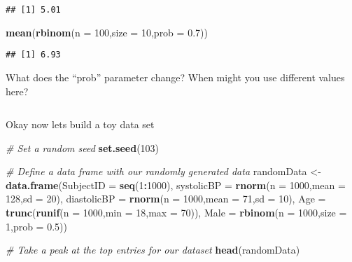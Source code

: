 \documentclass[
]{article}
\newenvironment{Shaded}{\begin{snugshade}}{\end{snugshade}}
\newcommand{\AttributeTok}[1]{\textcolor[rgb]{0.13,0.29,0.53}{#1}}
\newcommand{\CommentTok}[1]{\textcolor[rgb]{0.56,0.35,0.01}{\textit{#1}}}
\newcommand{\DecValTok}[1]{\textcolor[rgb]{0.00,0.00,0.81}{#1}}
\newcommand{\FloatTok}[1]{\textcolor[rgb]{0.00,0.00,0.81}{#1}}
\newcommand{\FunctionTok}[1]{\textcolor[rgb]{0.13,0.29,0.53}{\textbf{#1}}}
\newcommand{\NormalTok}[1]{#1}
\newcommand{\OtherTok}[1]{\textcolor[rgb]{0.56,0.35,0.01}{#1}}
\newcommand{\SpecialCharTok}[1]{\textcolor[rgb]{0.81,0.36,0.00}{\textbf{#1}}}
\newcommand{\StringTok}[1]{\textcolor[rgb]{0.31,0.60,0.02}{#1}}
\begin{document}
\begin{verbatim}
## [1] 5.01
\end{verbatim}

\begin{Shaded}
\begin{Highlighting}[]
\FunctionTok{mean}\NormalTok{(}\FunctionTok{rbinom}\NormalTok{(}\AttributeTok{n =} \DecValTok{100}\NormalTok{,}\AttributeTok{size =} \DecValTok{10}\NormalTok{,}\AttributeTok{prob =} \FloatTok{0.7}\NormalTok{))}
\end{Highlighting}
\end{Shaded}

\begin{verbatim}
## [1] 6.93
\end{verbatim}

What does the ``prob'' parameter change? When might you use different
values here?

\(~\)

Okay now lets build a toy data set

\begin{Shaded}
\begin{Highlighting}[]
\CommentTok{\# Set a random seed}
\FunctionTok{set.seed}\NormalTok{(}\DecValTok{103}\NormalTok{) }

\CommentTok{\# Define a data frame with our randomly generated data}
\NormalTok{randomData }\OtherTok{\textless{}{-}} \FunctionTok{data.frame}\NormalTok{(}\StringTok{\textquotesingle{}SubjectID\textquotesingle{}} \OtherTok{=} \FunctionTok{seq}\NormalTok{(}\DecValTok{1}\SpecialCharTok{:}\DecValTok{1000}\NormalTok{), }
                         \StringTok{\textquotesingle{}systolicBP\textquotesingle{}} \OtherTok{=} \FunctionTok{rnorm}\NormalTok{(}\AttributeTok{n =} \DecValTok{1000}\NormalTok{,}\AttributeTok{mean =} \DecValTok{128}\NormalTok{,}\AttributeTok{sd =} \DecValTok{20}\NormalTok{),}
                         \StringTok{\textquotesingle{}diastolicBP\textquotesingle{}} \OtherTok{=} \FunctionTok{rnorm}\NormalTok{(}\AttributeTok{n =} \DecValTok{1000}\NormalTok{,}\AttributeTok{mean =} \DecValTok{71}\NormalTok{,}\AttributeTok{sd =} \DecValTok{10}\NormalTok{),}
                         \StringTok{\textquotesingle{}Age\textquotesingle{}} \OtherTok{=} \FunctionTok{trunc}\NormalTok{(}\FunctionTok{runif}\NormalTok{(}\AttributeTok{n =} \DecValTok{1000}\NormalTok{,}\AttributeTok{min =} \DecValTok{18}\NormalTok{,}\AttributeTok{max =} \DecValTok{70}\NormalTok{)),}
                         \StringTok{\textquotesingle{}Male\textquotesingle{}} \OtherTok{=} \FunctionTok{rbinom}\NormalTok{(}\AttributeTok{n =} \DecValTok{1000}\NormalTok{,}\AttributeTok{size =} \DecValTok{1}\NormalTok{,}\AttributeTok{prob =} \FloatTok{0.5}\NormalTok{))}

\CommentTok{\# Take a peak at the top entries for our dataset }
\FunctionTok{head}\NormalTok{(randomData)}
\end{Highlighting}
\end{Shaded}
\end{document}
